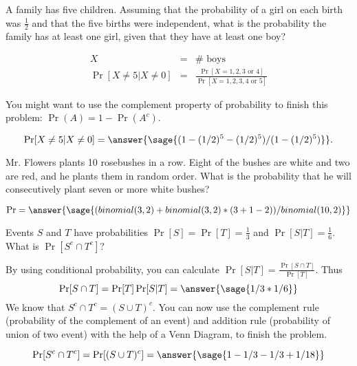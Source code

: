 \documentclass{ximera}
\begin{document}
\begin{problem}
A family has five children. Assuming that the probability of a girl on each birth was $\frac{1}{2}$ and that the five births were independent, what is the probability the family has at least one girl, given that they have at least one boy? 
\begin{hint}
\begin{eqnarray*} X&=& \# \text{ boys } \\ 
\Pr[X \not= 5 | X \not= 0 ] &=&\frac{\Pr[X=1,2,3\text{ or }4]}{\Pr[X=1,2,3,4 \text{ or }5]} \end{eqnarray*} 

You might want to use the complement property of probability to finish this problem: $\Pr(A)=1-\Pr(A^c)$.
\end{hint}

\begin{prompt}
$$\Pr[X \not= 5 | X \not= 0 ]=\answer{\sage{(1-(1/2)^5-(1/2)^5)/(1-(1/2)^5)}}.$$
\end{prompt}

\end{problem}

\begin{problem}
Mr. Flowers plants 10 rosebushes in a row. Eight of the bushes are white and two are red, and he plants them in random order. What is the probability that he will consecutively plant seven or more white bushes? 
\begin{hint}
\end{hint}

\begin{prompt}
$$\Pr=\answer{\sage{(binomial(3,2)+binomial(3,2)*(3+1-2))/binomial(10,2)}}$$
\end{prompt}

\end{problem}

\begin{problem}
 Events $S$ and $T$ have probabilities $\Pr[S] = \Pr[T] =\frac{1}{3}$ and $\Pr[S|T] =\frac{1}{6} $. What is $\Pr[S^c\cap T^c]$?
\begin{hint}
By using conditional probability, you can calculate $\Pr[S|T]=\frac{\Pr[S \cap T]}{\Pr[T]}$. Thus 
$$
\Pr[S \cap T]=\Pr[T]\Pr[S|T]=\answer{\sage{1/3*1/6}}
$$ 
We know that $S^c\cap T^c=(S\cup T)^c$. You can now use the complement rule (probability of the complement of an event) and addition rule (probability of union of two event) with the help of a Venn Diagram, to finish the problem.
\end{hint}

\begin{prompt}
$$
\Pr[S^c \cap T^c]=\Pr[(S \cup T)^c]=\answer{\sage{1-1/3-1/3+1/18}}
$$

\end{prompt}

\end{problem}
\end{document}
